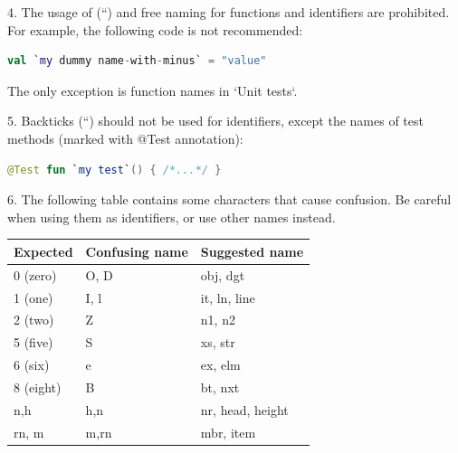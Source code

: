 4.	The usage of (``) and free naming for functions and identifiers are prohibited. For example, the following code is not recommended:



\begin{lstlisting}[language=Kotlin]
val `my dummy name-with-minus` = "value" 
\end{lstlisting}


The only exception is function names in `Unit tests`.



5.	Backticks (``) should not be used for identifiers, except the names of test methods (marked with @Test annotation):

\begin{lstlisting}[language=Kotlin]
 @Test fun `my test`() { /*...*/ }
\end{lstlisting}
6.  The following table contains some characters that cause confusion. Be careful when using them as identifiers, or use other names instead.



\begin{center}

\begin{tabular}{ |p{}|p{}|p{}| }

\hline

Expected&Confusing name&Suggested name\\

\hline

 0 (zero)      & O, D                     & obj, dgt         \\

 1 (one)       & I, l                     & it, ln, line     \\

 2 (two)       & Z                        & n1, n2           \\

 5 (five)      & S                        & xs, str          \\

 6 (six)       & e                        & ex, elm          \\

 8 (eight)     & B                        & bt, nxt          \\

 n,h           & h,n                      & nr, head, height \\

 rn, m         & m,rn                     & mbr, item        \\

\hline

\end{tabular}

\end{center}

